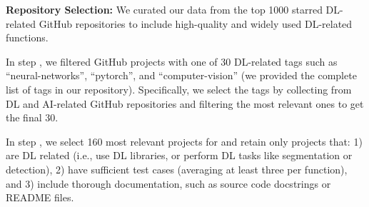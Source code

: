 

\textbf{Repository Selection:} We curated our data from the top 1000 starred DL-related GitHub repositories to include high-quality and widely used DL-related functions.

In step , we filtered GitHub projects with one of 30 DL-related tags such as ``neural-networks'',  ``pytorch'', and ``computer-vision'' (we provided the complete list of tags in our repository). 
Specifically, we select the tags
by collecting from DL and AI-related GitHub repositories and filtering the most relevant ones to get the final 30.

In step , we select 160 most relevant projects for \tool and
retain only projects that: 1) are DL related (i.e., use DL libraries, or perform DL tasks like segmentation or detection), 2) have sufficient test cases (averaging at least three per function), and 3) include thorough documentation, such as source code docstrings or README files. 

